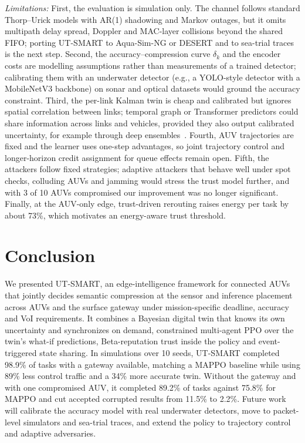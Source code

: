 \documentclass[lettersize,journal]{IEEEtran}
\begin{document}
\emph{Limitations:} First, the evaluation is simulation only. The channel follows standard Thorp--Urick models with AR(1) shadowing and Markov outages, but it omits multipath delay spread, Doppler and MAC-layer collisions beyond the shared FIFO; porting UT-SMART to Aqua-Sim-NG or DESERT and to sea-trial traces~\cite{song2025dtna,xu2025stgr} is the next step. Second, the accuracy--compression curve $\delta_k$ and the encoder costs are modelling assumptions rather than measurements of a trained detector; calibrating them with an underwater detector (e.g., a YOLO-style detector with a MobileNetV3 backbone) on sonar and optical datasets would ground the accuracy constraint. Third, the per-link Kalman twin is cheap and calibrated but ignores spatial correlation between links; temporal graph or Transformer predictors could share information across links and vehicles, provided they also output calibrated uncertainty, for example through deep ensembles~\cite{lakshminarayanan2017ensembles}. Fourth, AUV trajectories are fixed and the learner uses one-step advantages, so joint trajectory control and longer-horizon credit assignment for queue effects remain open. Fifth, the attackers follow fixed strategies; adaptive attackers that behave well under spot checks, colluding AUVs and jamming would stress the trust model further, and with 3 of 10 AUVs compromised our improvement was no longer significant. Finally, at the AUV-only edge, trust-driven rerouting raises energy per task by about 73\%, which motivates an energy-aware trust threshold.

\section{Conclusion}\label{sec:concl}
We presented UT-SMART, an edge-intelligence framework for connected AUVs that jointly decides semantic compression at the sensor and inference placement across AUVs and the surface gateway under mission-specific deadline, accuracy and VoI requirements. It combines a Bayesian digital twin that knows its own uncertainty and synchronizes on demand, constrained multi-agent PPO over the twin's what-if predictions, Beta-reputation trust inside the policy and event-triggered state sharing. In simulations over 10 seeds, UT-SMART completed 98.9\% of tasks with a gateway available, matching a MAPPO baseline while using 89\% less control traffic and a 34\% more accurate twin. Without the gateway and with one compromised AUV, it completed 89.2\% of tasks against 75.8\% for MAPPO and cut accepted corrupted results from 11.5\% to 2.2\%. Future work will calibrate the accuracy model with real underwater detectors, move to packet-level simulators and sea-trial traces, and extend the policy to trajectory control and adaptive adversaries.
\end{document}
